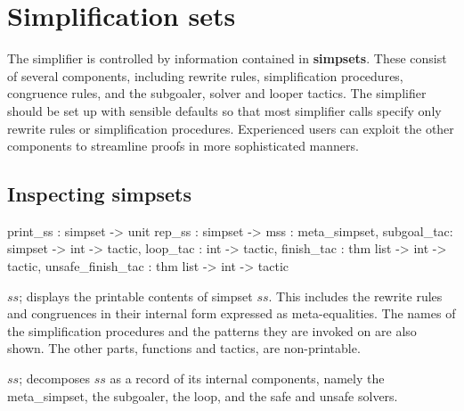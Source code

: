 \section{Simplification sets} 

The simplifier is controlled by information contained in {\bf
  simpsets}.  These consist of several components, including rewrite
rules, simplification procedures, congruence rules, and the subgoaler,
solver and looper tactics.  The simplifier should be set up with
sensible defaults so that most simplifier calls specify only rewrite
rules or simplification procedures.  Experienced users can exploit the
other components to streamline proofs in more sophisticated manners.

\subsection{Inspecting simpsets}
\begin{ttbox}
print_ss : simpset -> unit
rep_ss   : simpset -> {mss        : meta_simpset, 
                       subgoal_tac: simpset  -> int -> tactic,
                       loop_tac   :             int -> tactic,
                       finish_tac : thm list -> int -> tactic,
                unsafe_finish_tac : thm list -> int -> tactic}
\end{ttbox}
\begin{ttdescription}
  
\item[\ttindexbold{print_ss} $ss$;] displays the printable contents of
  simpset $ss$.  This includes the rewrite rules and congruences in
  their internal form expressed as meta-equalities.  The names of the
  simplification procedures and the patterns they are invoked on are
  also shown.  The other parts, functions and tactics, are
  non-printable.

\item[\ttindexbold{rep_ss} $ss$;] decomposes $ss$ as a record of its internal 
  components, namely the meta_simpset, the subgoaler, the loop, and the safe
  and unsafe solvers.

\end{ttdescription}


